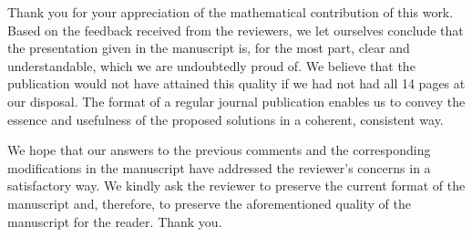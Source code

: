 \begin{authors}
Thank you for your appreciation of the mathematical contribution of this work.
Based on the feedback received from the reviewers, we let ourselves conclude
that the presentation given in the manuscript is, for the most part, clear and
understandable, which we are undoubtedly proud of. We believe that the
publication would not have attained this quality if we had not had all 14 pages
at our disposal. The format of a regular journal publication enables us to
convey the essence and usefulness of the proposed solutions in a coherent,
consistent way.

We hope that our answers to the previous comments and the corresponding
modifications in the manuscript have addressed the reviewer's concerns in a
satisfactory way. We kindly ask the reviewer to preserve the current format of
the manuscript and, therefore, to preserve the aforementioned quality of the
manuscript for the reader. Thank you.
\end{authors}
